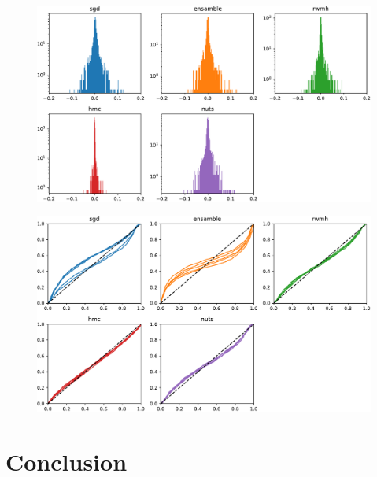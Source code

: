 \documentclass[12pt]{article}
\begin{document}
\begin{figure}[h]
\centering
\includegraphics[width=15cm]{plots/uci_residuals_hist.pdf}
\caption{}
\label{fig_uci_residuals_hist}
\end{figure}


\begin{figure}[h]
\centering
\includegraphics[width=15cm]{plots/uci_residuals_pvals.pdf}
\caption{}
\label{fig_uci_residuals_pvals}
\end{figure}

\section{Conclusion}
	
\end{document}
